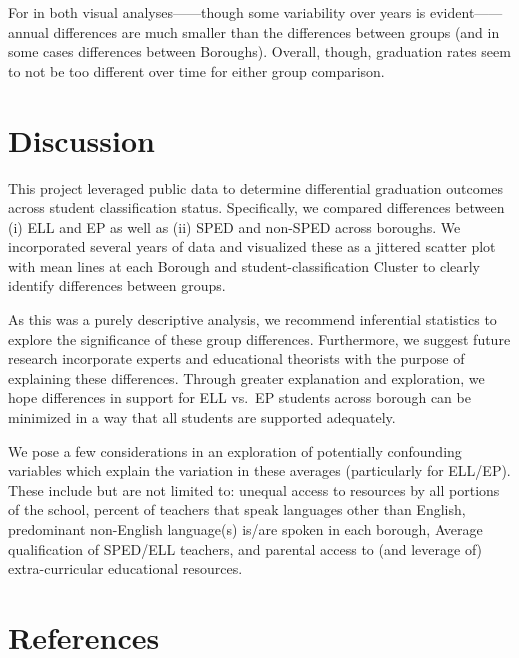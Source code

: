 \documentclass[
  english,
  man, fleqn, noextraspace]{apa6}
\begin{document}
For in both visual analyses------though some variability over years is evident------annual differences are much smaller than the differences between groups (and in some cases differences between Boroughs). Overall, though, graduation rates seem to not be too different over time for either group comparison.

\hypertarget{discussion}{%
\section{Discussion}\label{discussion}}

This project leveraged public data to determine differential graduation outcomes across student classification status. Specifically, we compared differences between (i) ELL and EP as well as (ii) SPED and non-SPED across boroughs. We incorporated several years of data and visualized these as a jittered scatter plot with mean lines at each Borough and student-classification Cluster to clearly identify differences between groups.

As this was a purely descriptive analysis, we recommend inferential statistics to explore the significance of these group differences. Furthermore, we suggest future research incorporate experts and educational theorists with the purpose of explaining these differences. Through greater explanation and exploration, we hope differences in support for ELL vs.~EP students across borough can be minimized in a way that all students are supported adequately.

We pose a few considerations in an exploration of potentially confounding variables which explain the variation in these averages (particularly for ELL/EP). These include but are not limited to: unequal access to resources by all portions of the school, percent of teachers that speak languages other than English, predominant non-English language(s) is/are spoken in each borough, Average qualification of SPED/ELL teachers, and parental access to (and leverage of) extra-curricular educational resources.

\newpage

\hypertarget{references}{%
\section{References}\label{references}}

\begingroup
\setlength{\parindent}{-0.5in}
\setlength{\leftskip}{0.5in}

\hypertarget{refs}{}

\endgroup
\end{document}
